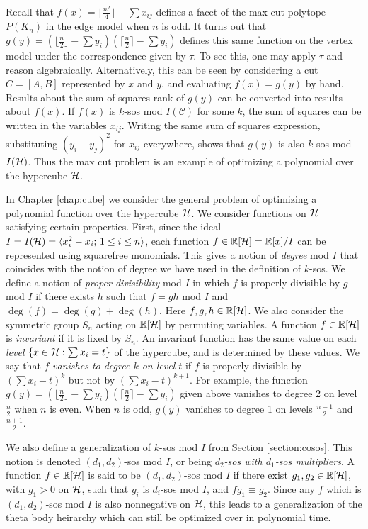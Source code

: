 Recall that $f(x) = \lfloor \frac{n^2}{4} \rfloor - \sum x_{ij}$ defines a facet of the max cut polytope $P(K_n)$ in the edge model when $n$ is odd.
It turns out that $g(y) = (\lfloor \frac{n}{2} \rfloor - \sum y_i)(\lceil \frac{n}{2} \rceil - \sum y_i)$ defines this same function on the vertex model under the correspondence given by $\tau$.
To see this, one may apply $\tau$ and reason algebraically.
Alternatively, this can be seen by considering a cut $C = [A,B]$ represented by $x$ and $y$, and evaluating $f(x) = g(y)$ by hand.
Results about the sum of squares rank of $g(y)$ can be converted into results about $f(x)$.
If $f(x)$ is $k$-sos mod $I(\mathcal{C})$ for some $k$, the sum of squares can be written in the variables $x_{ij}$.
Writing the same sum of squares expression, substituting $(y_i - y_j)^2$ for $x_{ij}$ everywhere, shows that $g(y)$ is also $k$-sos mod $I(\mathcal{H})$.
Thus the max cut problem is an example of optimizing a polynomial over the hypercube $\mathcal{H}$.

In Chapter \ref{chap:cube} we consider the general problem of optimizing a polynomial function over the hypercube $\mathcal{H}$. 
We consider functions on $\mathcal{H}$ satisfying certain properties.
First, since the ideal $I = I(\mathcal{H}) = \langle x_i^2 - x_i ;\, 1 \le i \le n\rangle$, each function $f \in \mathbb{R}[\mathcal{H}] = \mathbb{R}[x] / I$ can be represented using squarefree monomials.
This gives a notion of {\em degree} mod $I$ that coincides with the notion of degree we have used in the definition of $k$-sos.
We define a notion of {\em proper divisibility} mod $I$ in which $f$ is properly divisible by $g$ mod $I$ if there exists $h$ such that $f=gh$ mod $I$ and $\deg(f) = \deg(g) + \deg(h)$.
Here $f,g,h \in \mathbb{R}[\mathcal{H}]$.
We also consider the symmetric group $S_n$ acting on $\mathbb{R}[\mathcal{H}]$ by permuting variables.
A function $f \in \mathbb{R}[\mathcal{H}]$ is {\em invariant} if it is fixed by $S_n$.
An invariant function has the same value on each {\em level} $\{x \in \mathcal{H}: \sum x_i = t \}$ of the hypercube, and is determined by these values.
We say that $f$ {\em vanishes to degree $k$ on level $t$} if $f$ is properly divisible by $(\sum x_i - t)^k$ but not by $(\sum x_i - t)^{k+1}$.
For example, the function $g(y) = (\lfloor \frac{n}{2} \rfloor - \sum y_i)(\lceil \frac{n}{2} \rceil - \sum y_i)$ given above vanishes to degree 2 on level $\frac{n}{2}$ when $n$ is even.
When $n$ is odd, $g(y)$ vanishes to degree 1 on levels $\frac{n-1}{2}$ and $\frac{n+1}{2}$.

We also define a generalization of $k$-sos mod $I$ from Section \ref{section:cosos}.
This notion is denoted $(d_1,d_2)$-sos mod $I$, or being {\em $d_2$-sos with $d_1$-sos multipliers}.
A function $f \in \mathbb{R}[\mathcal{H}]$ is said to be $(d_1,d_2)$-sos mod $I$ if there exist $g_1,g_2 \in \mathbb{R}[\mathcal{H}]$, with $g_1 > 0$ on $\mathcal{H}$, such that $g_i$ is $d_i$-sos mod $I$, and $fg_1 \equiv g_2$.
Since any $f$ which is $(d_1,d_2)$-sos mod $I$ is also nonnegative on $\mathcal{H}$, this leads to a generalization of the theta body heirarchy which can still be optimized over in polynomial time.

